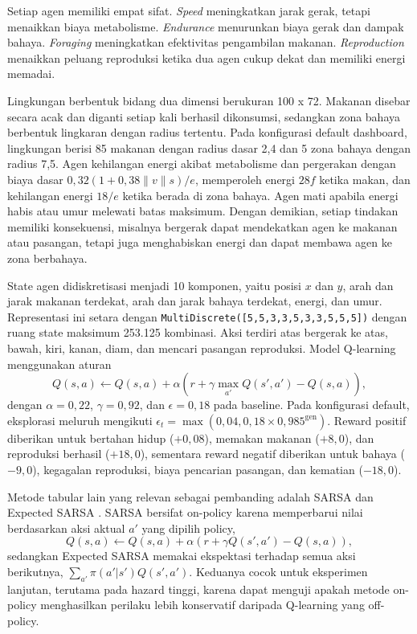 \documentclass[10pt]{article}
\begin{document}
Setiap agen memiliki empat sifat. \textit{Speed} meningkatkan jarak gerak, tetapi menaikkan biaya metabolisme. \textit{Endurance} menurunkan biaya gerak dan dampak bahaya. \textit{Foraging} meningkatkan efektivitas pengambilan makanan. \textit{Reproduction} menaikkan peluang reproduksi ketika dua agen cukup dekat dan memiliki energi memadai.

Lingkungan berbentuk bidang dua dimensi berukuran 100 x 72. Makanan disebar secara acak dan diganti setiap kali berhasil dikonsumsi, sedangkan zona bahaya berbentuk lingkaran dengan radius tertentu. Pada konfigurasi default dashboard, lingkungan berisi 85 makanan dengan radius dasar 2,4 dan 5 zona bahaya dengan radius 7,5. Agen kehilangan energi akibat metabolisme dan pergerakan dengan biaya dasar $0{,}32(1+0{,}38\|v\|s)/e$, memperoleh energi $28f$ ketika makan, dan kehilangan energi $18/e$ ketika berada di zona bahaya. Agen mati apabila energi habis atau umur melewati batas maksimum. Dengan demikian, setiap tindakan memiliki konsekuensi, misalnya bergerak dapat mendekatkan agen ke makanan atau pasangan, tetapi juga menghabiskan energi dan dapat membawa agen ke zona berbahaya.

State agen didiskretisasi menjadi 10 komponen, yaitu posisi $x$ dan $y$, arah dan jarak makanan terdekat, arah dan jarak bahaya terdekat, energi, dan umur. Representasi ini setara dengan \texttt{MultiDiscrete([5,5,3,3,5,3,3,5,5,5])} dengan ruang state maksimum 253.125 kombinasi. Aksi terdiri atas bergerak ke atas, bawah, kiri, kanan, diam, dan mencari pasangan reproduksi. Model Q-learning menggunakan aturan
\[
Q(s,a) \leftarrow Q(s,a) + \alpha \left(r + \gamma \max_{a'}Q(s',a') - Q(s,a)\right),
\]
dengan $\alpha=0{,}22$, $\gamma=0{,}92$, dan $\epsilon=0{,}18$ pada baseline. Pada konfigurasi default, eksplorasi meluruh mengikuti $\epsilon_t=\max(0{,}04,0{,}18\times0{,}985^{\mathrm{gen}})$. Reward positif diberikan untuk bertahan hidup ($+0{,}08$), memakan makanan ($+8{,}0$), dan reproduksi berhasil ($+18{,}0$), sementara reward negatif diberikan untuk bahaya ($-9{,}0$), kegagalan reproduksi, biaya pencarian pasangan, dan kematian ($-18{,}0$).

Metode tabular lain yang relevan sebagai pembanding adalah SARSA dan Expected SARSA \citep{sutton2018reinforcement}. SARSA bersifat on-policy karena memperbarui nilai berdasarkan aksi aktual $a'$ yang dipilih policy,
\[
Q(s,a) \leftarrow Q(s,a)+\alpha\left(r+\gamma Q(s',a')-Q(s,a)\right),
\]
sedangkan Expected SARSA memakai ekspektasi terhadap semua aksi berikutnya, $\sum_{a'}\pi(a'|s')Q(s',a')$. Keduanya cocok untuk eksperimen lanjutan, terutama pada hazard tinggi, karena dapat menguji apakah metode on-policy menghasilkan perilaku lebih konservatif daripada Q-learning yang off-policy.
\end{document}
